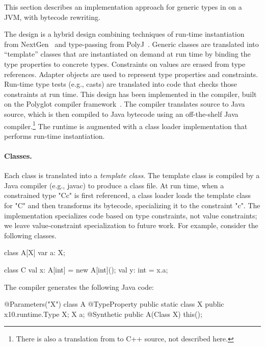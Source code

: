 This section describes an implementation approach for generic types in
\Xten{} on a JVM, with bytecode rewriting.

The design is a hybrid design combining techniques of run-time
instantiation from
NextGen~\cite{nextgen,allen03,allen04} and type-passing from
PolyJ~\cite{java-popl97}.  Generic classes are translated
into ``template'' classes that are instantiated on demand at run time by
binding the type properties to concrete types.
%
Constraints on values are erased from type references.
Adapter objects are used to represent type
properties and constraints.  
Run-time type tests (e.g., casts) are translated
into code that checks those constraints at run time.
%
This design has been implemented in the \Xten{} compiler, built
on the Polyglot compiler framework~\cite{ncm03}.  The compiler
translates \Xten{} source to Java source, which is then compiled
to Java bytecode using an off-the-shelf Java compiler.\footnote{There is also
a translation from \Xten{} to C++ source, not described here.}
The \Xten{} runtime is augmented with a class loader
implementation that performs run-time instantiation.

\paragraph{Classes.}
Each class is translated into a \emph{template class}.
The template class is compiled by a Java compiler (e.g., javac)
to produce a class file.
At run time, when a constrained type \xcd"C{c}" is first referenced, a
class loader loads the template class for \xcd"C" and then
transforms its bytecode, specializing it to the constraint
\xcd"c".  The implementation specializes code based on type constraints,
not value constraints; we leave value-constraint specialization to
future work.
%
For example, consider the following classes.
{
\begin{xten}
class A[X] {
  var a: X;
}
\end{xten}}
{
\begin{xten}
class C {
  val x: A[int] = new A[int]();
  val y: int = x.a;
}
\end{xten}}

The compiler generates the following Java code:
{
\begin{xten}
@Parameters({"X"})
class A {
  @TypeProperty public static class X { }
  public x10.runtime.Type X;
  X a;
  @Synthetic public A(Class X) { this(); }
}
\end{xten}}
{
}

